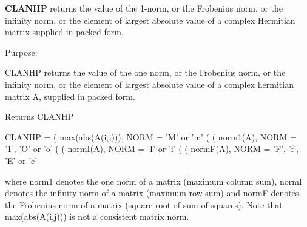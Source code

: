 {\bfseries C\+L\+A\+N\+H\+P} returns the value of the 1-\/norm, or the Frobenius norm, or the infinity norm, or the element of largest absolute value of a complex Hermitian matrix supplied in packed form. 

 \begin{DoxyParagraph}{Purpose\+: }
\begin{DoxyVerb} CLANHP  returns the value of the one norm,  or the Frobenius norm, or
 the  infinity norm,  or the  element of  largest absolute value  of a
 complex hermitian matrix A,  supplied in packed form.\end{DoxyVerb}

\end{DoxyParagraph}
\begin{DoxyReturn}{Returns}
C\+L\+A\+N\+H\+P \begin{DoxyVerb}    CLANHP = ( max(abs(A(i,j))), NORM = 'M' or 'm'
             (
             ( norm1(A),         NORM = '1', 'O' or 'o'
             (
             ( normI(A),         NORM = 'I' or 'i'
             (
             ( normF(A),         NORM = 'F', 'f', 'E' or 'e'

 where  norm1  denotes the  one norm of a matrix (maximum column sum),
 normI  denotes the  infinity norm  of a matrix  (maximum row sum) and
 normF  denotes the  Frobenius norm of a matrix (square root of sum of
 squares).  Note that  max(abs(A(i,j)))  is not a consistent matrix norm.\end{DoxyVerb}
 
\end{DoxyReturn}

